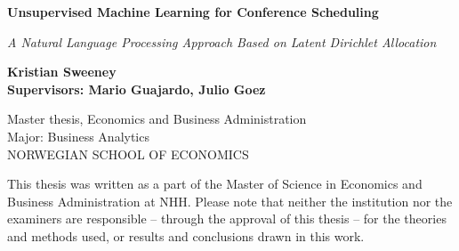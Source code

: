 
\begin{titlepage}
	
	
	\thispagestyle{frontpage}
	
	\begin{center}
		
		\vspace*{6\baselineskip}
	
		
		{\Huge \textbf{Unsupervised Machine Learning for Conference Scheduling\\}}
		
		\large{\textit{A Natural Language Processing Approach Based on Latent Dirichlet Allocation}}\\
		
        \vspace*{1,5\baselineskip}

		\large{\textbf{Kristian Sweeney}}\\
		\large{\textbf{Supervisors: Mario Guajardo, Julio Goez}}\\
		
		\vspace{1,5\baselineskip}
		
		\large{Master thesis, Economics and Business
Administration}\\
		\large{Major: Business Analytics}\\
		
		\vspace{1,5\baselineskip}
		\large{NORWEGIAN SCHOOL OF ECONOMICS}\\

	\end{center}
	
	\vspace*{2\baselineskip}
	{This thesis was written as a part of the Master of Science in Economics and Business Administration at NHH. Please note that neither the institution nor the examiners are
responsible – through the approval of this thesis – for the theories and methods used, or
results and conclusions drawn in this work.}
	
\end{titlepage}
